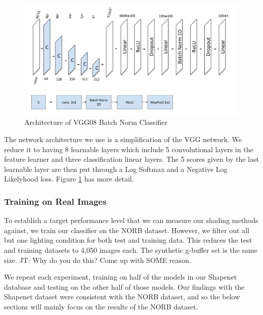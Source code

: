 \documentclass[10pt,twocolumn,letterpaper]{article}
\newcommand{\tompson}[1]{{\color{green} JT: #1}}
\begin{document}
\begin{figure}[h!]
\centering
\includegraphics[width=1.0\columnwidth]{./assets/vgg08_diagram.pdf}
\caption{Architecture of VGG08 Batch Norm Classifier}
\label{fig:VGG_DAIGRAM}
\end{figure}
The network architecture we use is a simplification of the VGG network\cite{DBLP:journals/corr/SimonyanZ14a}.  We reduce it to having 8 learnable layers which include 5 convolutional layers in the feature learner and three classification linear layers.   
The 5 scores given by the last learnable layer are then put through a Log Softmax and a Negative Log Likelyhood loss. %
Figure \ref{fig:VGG_DAIGRAM} has more detail.\\

\subsubsection{Training on Real Images}
To establish a target performance level that we can measure our shading methods against, we train our classifier on the NORB dataset. However, we filter out all but one lighting condition for both test and training data.  This reduces the test and training datasets to 4,050 images each.  The synthetic g-buffer set is the same size. \tompson{Why do you do this? Come up with SOME reason.}

 We repeat each experiment, training on half of the models in our Shapenet database and testing on the other half of those models. Our findings with the Shapenet dataset were consistent with the NORB dataset, and so the below sections will mainly focus on the results of the NORB dataset.
\end{document}
